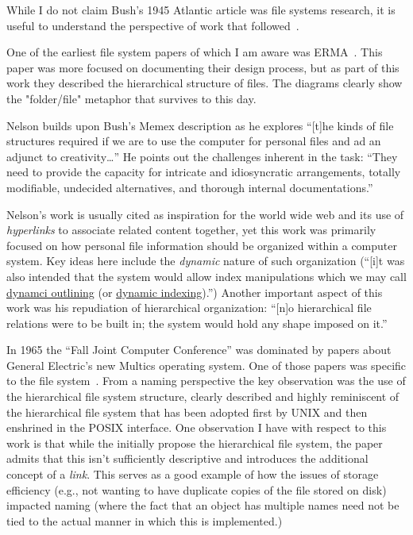 While I do not claim Bush's 1945 Atlantic article was file systems
research, it is useful to understand the perspective of work that
followed~\cite{bush1945we}.


One of the earliest file system papers of which I am aware was
ERMA~\cite{barnard1958}.  This paper was more focused on documenting their
design process, but as part of this work they described the hierarchical
structure of files.  The diagrams clearly show the "folder/file" metaphor that
survives to this day.


Nelson builds upon Bush's Memex description as he explores ``[t]he kinds of file
structures required if we are to use the computer for personal files and ad an
adjunct to creativity\ldots''  He points out the challenges inherent in the
task: ``They need to provide the capacity for intricate and idiosyncratic
arrangements, totally modifiable, undecided alternatives, and thorough internal
documentations.''

Nelson's work is usually cited as inspiration for the world wide web and its use
of \emph{hyperlinks} to associate related content together, yet this work was
primarily focused on how personal file information should be organized within a
computer system.  Key ideas here include the \emph{dynamic} nature of such
organization (``[i]t was also intended that the system would allow index
manipulations which we may call \underline{dynamci outlining} (or
\underline{dynamic indexing}).'')  Another important aspect of this work was his
repudiation of hierarchical organization: ``[n]o hierarchical file relations
were to be built in; the system would hold any shape imposed on
it.''~\cite{nelson19654}


In 1965 the ``Fall Joint Computer Conference'' was dominated by papers about
General Electric's new Multics operating system.  One of those papers was
specific to the file system~\cite{daley1965general}.  From a naming perspective
the key observation was the use of the hierarchical file system structure,
clearly described and highly reminiscent of the hierarchical file system that
has been adopted first by UNIX and then enshrined in the POSIX interface.  One
observation I have with respect to this work is that while the initially propose
the hierarchical file system, the paper admits that this isn't sufficiently
descriptive and introduces the additional concept of a \emph{link}. This serves
as a good example of how the issues of storage efficiency (e.g., not wanting to
have duplicate copies of the file stored on disk) impacted naming (where the
fact that an object has multiple names need not be tied to the actual manner in
which this is implemented.)

